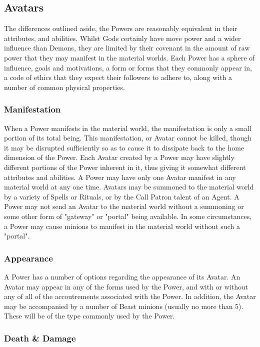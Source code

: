 \subsection{Avatars}

The differences outlined aside, the Powers are reasonably equivalent
in their attributes, and abilities. Whilst Gods certainly have move
power and a wider influence than Demons, they are limited by their
covenant in the amount of raw power that they may manifest in the
material worlds. Each Power has a sphere of influence, goals and
motivations, a form or forms that they commonly appear in, a code of
ethics that they expect their followers to adhere to, along with a
number of common physical properties.

\subsubsection{Manifestation}

When a Power manifests in the material world, the manifestation is
only a small portion of its total being. This manifestation, or Avatar
cannot be killed, though it may be disrupted sufficiently so as to
cause it to dissipate back to the home dimension of the Power. Each
Avatar created by a Power may have slightly different portions of the
Power inherent in it, thus giving it somewhat different attributes and
abilities. A Power may have only one Avatar manifest in any material
world at any one time.  Avatars may be summoned to the material world
by a variety of Spells or Rituals, or by the Call Patron talent of an
Agent.  A Power may not send an Avatar to the material world without a
summoning or some other form of "gateway" or "portal" being available.
In some circumstances, a Power may cause minions to manifest in the
material world without such a "portal".

\subsubsection{Appearance}

A Power has a number of options regarding the appearance of its
Avatar.  An Avatar may appear in any of the forms used by the Power,
and with or without any of all of the accoutrements associated with
the Power.  In addition, the Avatar may be accompanied by a number of
Beast minions (usually no more than 5).  These will be of the type
commonly used by the Power.

\subsubsection{Death \& Damage}

